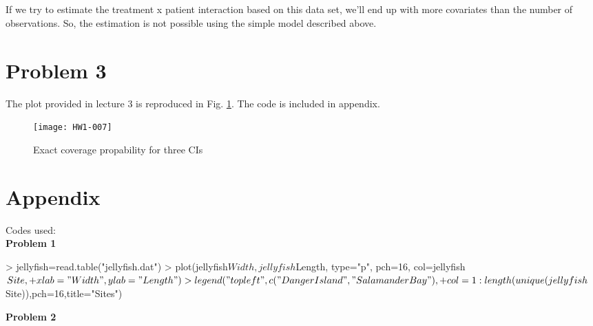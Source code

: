\documentclass{article}
\begin{document}
\subsection{}
If we try to estimate the treatment x patient interaction based on this data set, we'll end up with more covariates than the number of observations. So, the estimation is not possible using the simple model described above.


\section{Problem 3}

The plot provided in lecture 3 is reproduced in Fig. \ref{fig:3}. The code is included in appendix.
\begin{figure}[h]
\texttt{[image: HW1-007]}
\caption{Exact coverage propability for three CIs}
\label{fig:3}
\end{figure}

\section{Appendix}
Codes used:\\
\textbf{Problem 1}

\begin{Schunk}
\begin{Sinput}
> jellyfish=read.table("jellyfish.dat")
> plot(jellyfish$Width,jellyfish$Length, type="p", pch=16, col=jellyfish$Site,
+      xlab="Width", ylab="Length")
> legend("topleft", c("Danger Island", "Salamander Bay"),
+        col=1:length(unique(jellyfish$Site)),pch=16,title="Sites")
\end{Sinput}
\end{Schunk}

\textbf{Problem 2}

\begin{Schunk}
\end{Schunk}
\end{document}
